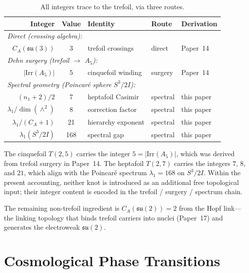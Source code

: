 \documentclass[11pt]{article}
\newcommand{\su}{\mathfrak{su}}
\newcommand{\CA}{C_A}
\begin{document}
\begin{table}[h]
\centering
\caption{All integers trace to the trefoil, via three routes.}
\label{tab:one-knot}
\begin{tabular}{rclll}
\toprule
Integer & Value & Identity & Route & Derivation \\
\midrule
\multicolumn{5}{l}{\textit{Direct (crossing algebra):}}\\
$\CA(\su(3))$ & 3 & trefoil crossings & direct & Paper~14 \\
\midrule
\multicolumn{5}{l}{\textit{Dehn surgery (trefoil $\to$ $A_5$):}}\\
$|\mathrm{Irr}(A_5)|$ & 5 & cinquefoil winding
  & surgery & Paper~14 \\
\midrule
\multicolumn{5}{l}{\textit{Spectral geometry (Poincar\'e sphere $S^3/2I$):}}\\
$(n_1{+}2)/2$ & 7 & heptafoil Casimir
  & spectral & this paper \\
$\lambda_1/\dim(\wedge^2)$ & 8 & correction factor
  & spectral & this paper \\
$\lambda_1/(\CA{+}1)$ & 21 & hierarchy exponent
  & spectral & this paper \\
$\lambda_1(S^3/2I)$ & 168 & spectral gap
  & spectral & this paper \\
\bottomrule
\end{tabular}
\end{table}

The cinquefoil $T(2,5)$ carries the integer
$5 = |\mathrm{Irr}(A_5)|$, which was derived from trefoil
surgery in Paper~14.  The heptafoil $T(2,7)$ carries the
integers $7$, $8$, and $21$, which align with the Poincar\'e
spectrum $\lambda_1 = 168$ on $S^3/2I$.  Within the present
accounting, neither knot is introduced as an additional free
topological input; their integer content is encoded in the
trefoil / surgery / spectrum chain.

The remaining non-trefoil ingredient is $\CA(\su(2)) = 2$ from
the Hopf link---the linking topology that binds trefoil carriers
into nuclei (Paper~17) and generates the electroweak $\su(2)$.


\section{Cosmological Phase Transitions}
\label{sec:cosmology}
\end{document}
